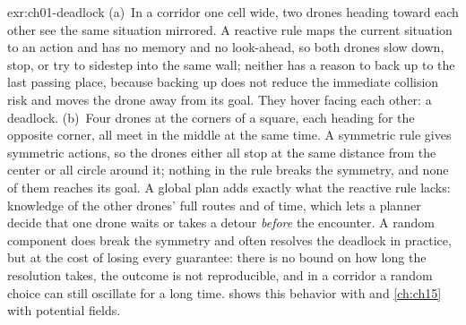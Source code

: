 \begin{solution}{exr:ch01-deadlock}
(a)~In a corridor one cell wide, two drones heading toward each other see the same
situation mirrored. A reactive rule maps the current situation to an action and has
no memory and no look-ahead, so both drones slow down, stop, or try to sidestep into
the same wall; neither has a reason to back up to the last passing place, because
backing up does not reduce the immediate collision risk and moves the drone away from
its goal. They hover facing each other: a deadlock. (b)~Four drones at the corners of
a square, each heading for the opposite corner, all meet in the middle at the same
time. A symmetric rule gives symmetric actions, so the drones either all stop at the
same distance from the center or all circle around it; nothing in the rule breaks the
symmetry, and none of them reaches its goal. A global plan adds exactly what the
reactive rule lacks: knowledge of the other drones' full routes and of time, which
lets a planner decide that one drone waits or takes a detour \emph{before} the
encounter. A random component does break the symmetry and often resolves the
deadlock in practice, but at the cost of losing every guarantee: there is no bound on
how long the resolution takes, the outcome is not reproducible, and in a corridor a
random choice can still oscillate for a long time.  shows this
behavior with \orca and \cref{ch:ch15} with potential fields.
\end{solution}

